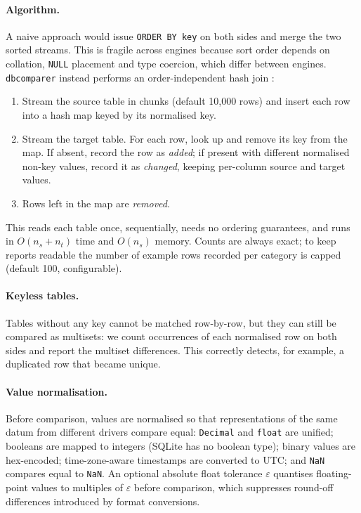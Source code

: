 \documentclass[11pt]{article}
\begin{document}
\paragraph{Algorithm.} A naive approach would issue \texttt{ORDER BY key}
on both sides and merge the two sorted streams. This is fragile across
engines because sort order depends on collation, \texttt{NULL} placement
and type coercion, which differ between engines. \texttt{dbcomparer}
instead performs an order-independent hash join
\citep{graefe1993query}:

\begin{enumerate}
  \item Stream the source table in chunks (default 10{,}000 rows) and
        insert each row into a hash map keyed by its normalised key.
  \item Stream the target table. For each row, look up and remove its key
        from the map. If absent, record the row as \emph{added}; if
        present with different normalised non-key values, record it as
        \emph{changed}, keeping per-column source and target values.
  \item Rows left in the map are \emph{removed}.
\end{enumerate}

This reads each table once, sequentially, needs no ordering guarantees,
and runs in $O(n_s + n_t)$ time and $O(n_s)$ memory. Counts are always
exact; to keep reports readable the number of example rows recorded per
category is capped (default 100, configurable).

\paragraph{Keyless tables.} Tables without any key cannot be matched
row-by-row, but they can still be compared as multisets: we count
occurrences of each normalised row on both sides and report the multiset
differences. This correctly detects, for example, a duplicated row that
became unique.

\paragraph{Value normalisation.} Before comparison, values are normalised
so that representations of the same datum from different drivers compare
equal: \texttt{Decimal} and \texttt{float} are unified; booleans are
mapped to integers (SQLite has no boolean type); binary values are
hex-encoded; time-zone-aware timestamps are converted to UTC; and
\texttt{NaN} compares equal to \texttt{NaN}. An optional absolute float
tolerance $\varepsilon$ quantises floating-point values to multiples of
$\varepsilon$ before comparison, which suppresses round-off differences
introduced by format conversions.
\end{document}
